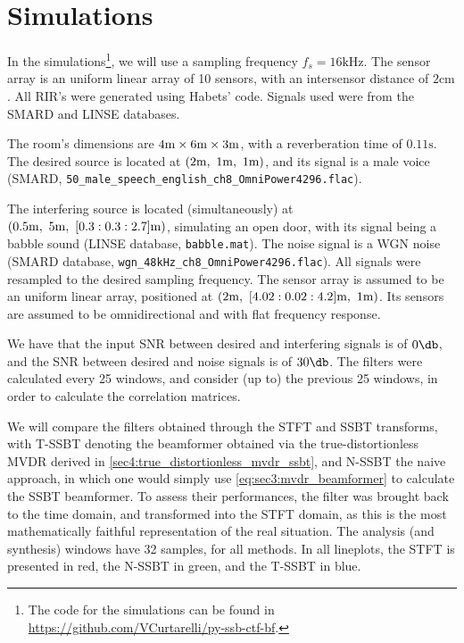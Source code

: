 
\section{Simulations}


In the simulations\footnote{The code for the simulations can be found in \url{https://github.com/VCurtarelli/py-ssb-ctf-bf}.}, we will use a sampling frequency $f_s = 16\si{\kilo\hertz}$. The sensor array is an uniform linear array of 10 sensors, with an intersensor distance of $2\si{\cm}$. All RIR's were generated using Habets' code. Signals used were from the SMARD and LINSE databases.

The room's dimensions are $4\si{\meter}\times6\si{\meter}\times3\si{\meter}$, with a reverberation time of $0.11\si{\second}$. The desired source is located at $(2\si{\meter},~1\si{\meter},~1\si{\meter})$, and its signal is a male voice (SMARD, \texttt{50\_male\_speech\_english\_ch8\_OmniPower4296.flac}).

The interfering source is located (simultaneously) at $(0.5\si{\meter},~5\si{\meter},~[0.3:0.3:2.7]\si{\meter})$, simulating an open door, with its signal being a babble sound (LINSE database, \texttt{babble.mat}). The noise signal is a WGN noise (SMARD database, \texttt{wgn\_48kHz\_ch8\_OmniPower4296.flac}). All signals were resampled to the desired sampling frequency. The sensor array is assumed to be an uniform linear array, positioned at $(2\si{\meter},~[4.02:0.02:4.2]\si{\meter},~1\si{\meter})$. Its sensors are assumed to be omnidirectional and with flat frequency response.

We have that the input SNR between desired and interfering signals is of $0\dB$, and the SNR between desired and noise signals is of $30\dB$. The filters were calculated every 25 windows, and consider (up to) the previous 25 windows, in order to calculate the correlation matrices.

We will compare the filters obtained through the STFT and SSBT transforms, with T-SSBT denoting the beamformer obtained via the true-distortionless MVDR derived in \cref{sec4:true_distortionless_mvdr_ssbt}, and N-SSBT the naive approach, in which one would simply use \cref{eq:sec3:mvdr_beamformer} to calculate the SSBT beamformer. To assess their performances, the filter was brought back to the time domain, and transformed into the STFT domain, as this is the most mathematically faithful representation of the real situation. The analysis (and synthesis) windows have 32 samples, for all methods. In all lineplots, the STFT is presented in red, the N-SSBT in green, and the T-SSBT in blue.

